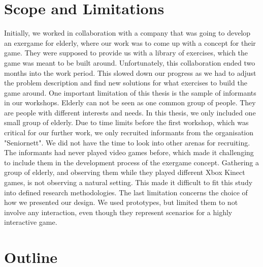 \section{Scope and Limitations}
Initially, we worked in collaboration with a company that was going to develop an exergame for elderly, where our work was to come up with a concept for their game. They were supposed to provide us with a library of exercises, which the game was meant to be built around. Unfortunately, this collaboration ended two months into the work period. This slowed down our progress as we had to adjust the problem description and find new solutions for what exercises to build the game around. One important limitation of this thesis is the sample of informants in our workshops. Elderly can not be seen as one common group of people. They are people with different interests and needs. In this thesis, we only included one small group of elderly. Due to time limits before the first workshop, which was critical for our further work, we only recruited informants from the organisation "Seniornett". We did not have the time to look into other arenas for recruiting. The informants had never played video games before, which made it challenging to include them in the development process of the exergame concept. Gathering a group of elderly, and observing them while they played different Xbox Kinect games, is not observing a natural setting. This made it difficult to fit this study into defined research methodologies. The last limitation concerns the choice of how we presented our design. We used prototypes, but limited them to not involve any interaction, even though they represent scenarios for a highly interactive game.  


\section{Outline}
